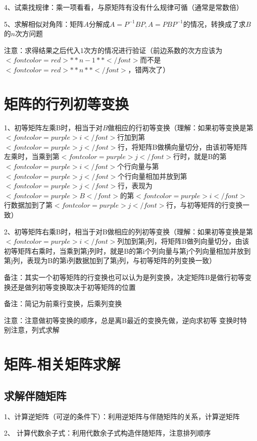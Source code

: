 4、试乘找规律：乘一项看看，与原矩阵有没有什么规律可循（通常是常数倍）

5、求解相似对角阵：矩阵$ A $分解成$ A=P^{-1}BP,A=PBP^{-1} $的情况，转换成了求$ B $的$ n $次方问题

注意：求得结果之后代入1次方的情况进行验证（前边系数的次方应该为$ <font color=red>**n-1**</font> $而不是$ <font color=red>**n**</font> $，错两次了）

\section{矩阵的行列初等变换}

1、初等矩阵左乘B时，相当于对$ B $做相应的行初等变换（理解：如果初等变换是第$ <font color=purple>i</font> $行加到第$ <font color=purple>j</font> $行，将矩阵B做横向量切分，由该初等矩阵左乘时，当乘到第$ <font color=purple>j</font> $行时，就是B的第$ <font color=purple>i</font> $个行向量与第$ <font color=purple>j</font> $个行向量相加并放到第$ <font color=purple>j</font> $行，表现为$ <font color=purple>B</font> $的第$ <font color=purple>i</font> $行数据加到了第$ <font color=purple>j</font> $行，与初等矩阵的行变换一致）

2、初等矩阵右乘B时，相当于对B做相应的列初等变换（理解：如果初等变换是第$ <font color=purple>i</font> $列加到第j列，将矩阵B做列向量切分，由该初等矩阵右乘时，当乘到第j列时，就是B的第i个列向量与第j个列向量相加并放到第j列，表现为B的第i列数据加到了第j列，与初等矩阵的列变换一致）

备注：其实一个初等矩阵的行变换也可以认为是列变换，决定矩阵B是做行初等变换还是做列初等变换取决于初等矩阵的位置

备注：简记为前乘行变换，后乘列变换

注意：注意做初等变换的顺序，总是离B最近的变换先做，逆向求初等 变换时特别注意，列式求解

\section{矩阵-相关矩阵求解}



\subsection{求解伴随矩阵}

1、计算逆矩阵（可逆的条件下）：利用逆矩阵与伴随矩阵的关系，计算逆矩阵

2、 计算代数余子式：利用代数余子式构造伴随矩阵，注意排列顺序

